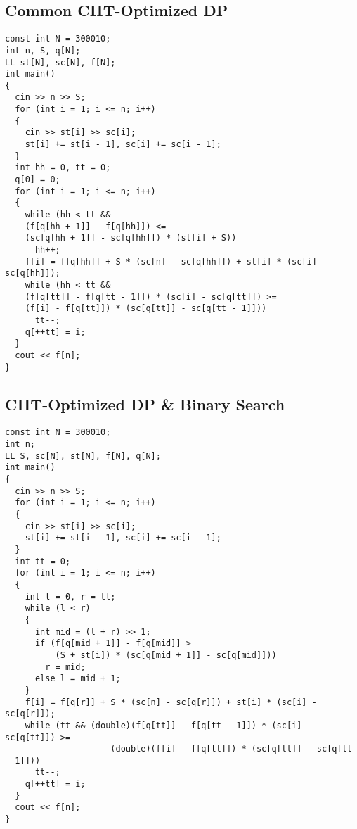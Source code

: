 \subsection{Common CHT-Optimized DP}
\begin{lstlisting}
const int N = 300010;
int n, S, q[N];
LL st[N], sc[N], f[N];
int main()
{
  cin >> n >> S;
  for (int i = 1; i <= n; i++)
  {
    cin >> st[i] >> sc[i];
    st[i] += st[i - 1], sc[i] += sc[i - 1];
  }
  int hh = 0, tt = 0;
  q[0] = 0;
  for (int i = 1; i <= n; i++)
  {
    while (hh < tt && 
    (f[q[hh + 1]] - f[q[hh]]) <= 
    (sc[q[hh + 1]] - sc[q[hh]]) * (st[i] + S))
      hh++;
    f[i] = f[q[hh]] + S * (sc[n] - sc[q[hh]]) + st[i] * (sc[i] - sc[q[hh]]);
    while (hh < tt && 
    (f[q[tt]] - f[q[tt - 1]]) * (sc[i] - sc[q[tt]]) >= 
    (f[i] - f[q[tt]]) * (sc[q[tt]] - sc[q[tt - 1]]))
      tt--;
    q[++tt] = i;
  }
  cout << f[n];
}
\end{lstlisting}
\subsection{CHT-Optimized DP \& Binary Search}
\begin{lstlisting}
const int N = 300010;
int n;
LL S, sc[N], st[N], f[N], q[N];
int main()
{
  cin >> n >> S;
  for (int i = 1; i <= n; i++)
  {
    cin >> st[i] >> sc[i];
    st[i] += st[i - 1], sc[i] += sc[i - 1];
  }
  int tt = 0;
  for (int i = 1; i <= n; i++)
  {
    int l = 0, r = tt;
    while (l < r)
    {
      int mid = (l + r) >> 1;
      if (f[q[mid + 1]] - f[q[mid]] >
          (S + st[i]) * (sc[q[mid + 1]] - sc[q[mid]]))
        r = mid;
      else l = mid + 1;
    }
    f[i] = f[q[r]] + S * (sc[n] - sc[q[r]]) + st[i] * (sc[i] - sc[q[r]]);
    while (tt && (double)(f[q[tt]] - f[q[tt - 1]]) * (sc[i] - sc[q[tt]]) >=
                     (double)(f[i] - f[q[tt]]) * (sc[q[tt]] - sc[q[tt - 1]]))
      tt--;
    q[++tt] = i;
  }
  cout << f[n];
}
\end{lstlisting}